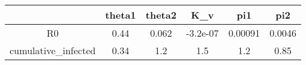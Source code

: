 \begin{tabular}{|c|c|c|c|c|c|}
\hline
& theta1 & theta2 & K_v & pi1 & pi2 \\
\hline
R0 & 0.44 & 0.062 & -3.2e-07 & 0.00091 & 0.0046 \\
\hline
cumulative_infected & 0.34 & 1.2 & 1.5 & 1.2 & 0.85 \\
\hline
\end{tabular}
